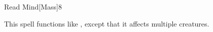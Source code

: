 \begin{spellsection}{Read Mind}[Mass]{8}
    \begin{spellheader}
    \end{spellheader}
    \begin{spellcontent}
        \begin{spelltargetinginfo}
        \end{spelltargetinginfo}
        \begin{spelleffects}
            \spellspecial This spell functions like , except that it affects multiple creatures.
        \end{spelleffects}
    \end{spellcontent}
    \begin{spellfooter}
        \miscastexplode
    \end{spellfooter}
\end{spellsection}

